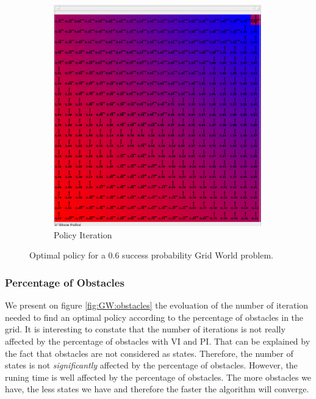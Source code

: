 \documentclass[10pt, twocolumn]{article}
\begin{document}
\begin{figure}[]
\begin{subfigure}[t]{0.24\textwidth}
						\includegraphics[width=\textwidth]{../graphics/GridWorld_0.6_pi_prob.png}
						\caption{Policy Iteration}
						\label{fig:GW:probability:PI}
					\end{subfigure}
					\caption{Optimal policy for a 0.6 success probability Grid World problem.}
					\label{fig:GW:probability:comparison}
				\end{figure}
			\subsubsection*{Percentage of Obstacles}
				We present on figure \ref{fig:GW:obstacles} the evoluation of the number of iteration needed to find an optimal policy according to the percentage of obstacles in the grid.
				It is interesting to constate that the number of iterations is not really affected by the percentage of obstacles with VI and PI. That can be explained by the fact that obstacles are not considered as states. Therefore, the number of states is not \textit{significantly} affected by the percentage of obstacles. However, the runing time is well affected by the percentage of obstacles. The more obstacles we have, the less states we have and therefore the faster the algorithm will converge.
\end{document}
